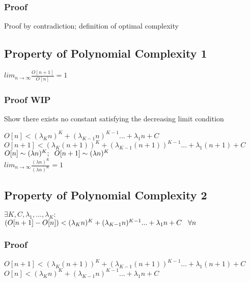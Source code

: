\documentclass[11pt]{article}
\begin{document}
\subsubsection{Proof}
Proof by contradiction; definition of optimal complexity









\subsection{Property of Polynomial  Complexity 1}
\begin{center}
$
lim_{n \rightarrow \infty} \frac{O[n+1]}{O[n]} = 1
$
\end{center}
\subsubsection{Proof WIP}
Show there exists no constant satisfying the decreasing limit condition
\begin{center}
$
O[n] < (\lambda_K n)^K + (\lambda_{K-1} n)^{K-1}... + \lambda_1 n + C
$
\\ \vspace{2mm}
$
O[n+1] < (\lambda_K (n+1))^K + (\lambda_{K-1} (n+1))^{K-1}... + \lambda_1 (n+1) + C
$
\\ \vspace{2mm}
$
O[n] \sim (\lambda n)^K; \hspace{2mm} O[n+1] \sim  (\lambda n)^K
$
\\ \vspace{2mm}
$
lim_{n \rightarrow \infty} \frac{(\lambda n)^K}{(\lambda n)^K} = 1
$
\end{center}







\subsection{Property of Polynomial Complexity 2}
\begin{center}
$
\exists K,C,\lambda_1,...,\lambda_K :
$
\\ \vspace{2mm}
$
( O[n+1] - O[n] ) < (\lambda_K n)^K + (\lambda_{K-1} n)^{K-1}... + \lambda_1 n + C \hspace{3mm} \forall n
$
\end{center}
\subsubsection{Proof}
\begin{center}
$
O[n+1] < (\lambda_K (n+1))^K + (\lambda_{K-1} (n+1))^{K-1}... + \lambda_1 (n+1) + C
$
\\ \vspace{2mm}
$
O[n] < (\lambda_K n)^K + (\lambda_{K-1} n)^{K-1}... + \lambda_1 n + C
$

\end{center}
\end{document}
